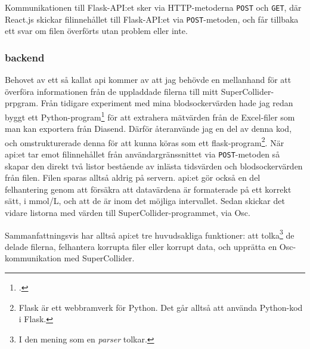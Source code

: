 \documentclass[11pt, a4paper]{article} %
\begin{document}
Kommunikationen till Flask-API:et sker via HTTP-metoderna \texttt{POST} och \texttt{GET}, där React.js skickar filinnehållet till Flask-API:et via \texttt{POST}-metoden, och får tillbaka ett svar om filen överförts utan problem eller inte.



\subsubsection*{\gls{backend}}
Behovet av ett så kallat \gls{api} kommer av att jag behövde en mellanhand för att överföra informationen från de uppladdade filerna till mitt SuperCollider-prpgram. Från tidigare experiment med mina blodsockervärden hade jag redan byggt ett Python-program\footcite{jondell_kj-jondelldiabetes-synth_2021} för att extrahera mätvärden från de Excel-filer som man kan exportera från Diasend. Därför återanvände jag en del av denna kod, och omstrukturerade denna för att kunna köras som ett \gls{flask}-program\footnote{Flask är ett webbramverk för Python. Det går alltså att använda Python-kod i Flask.}. När \gls{api}:et tar emot filinnehållet från användargränssnittet via \texttt{POST}-metoden så skapar den direkt två listor bestående av inlästa tidsvärden och blodsockervärden från filen. Filen sparas alltså aldrig på servern. \gls{api}:et gör också en del felhantering genom att försäkra att datavärdena är formaterade på ett korrekt sätt, i mmol/L, och att de är inom det möjliga intervallet. Sedan skickar det vidare listorna med värden till SuperCollider-programmet, via Osc. 

Sammanfattningsvis har alltså \gls{api}:et tre huvudsakliga funktioner: att tolka\footnote{I den mening som en \emph{parser} tolkar.} de delade filerna, felhantera korrupta filer eller korrupt data, och upprätta en Osc-kommunikation med SuperCollider.
\end{document}
